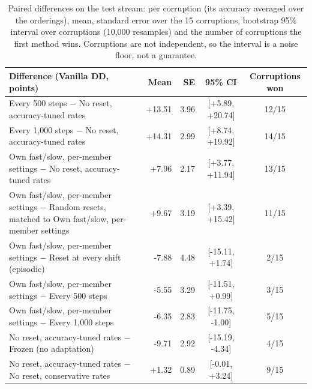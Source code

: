 \begin{table}[t]
  \centering\small
  \begin{tabular}{@{}lrrcc@{}}
    \toprule
    Difference (Vanilla DD, points) & Mean & SE & 95\% CI & Corruptions won \\
    \midrule
    Every 500 steps $-$ No reset, accuracy-tuned rates & +13.51 & 3.96 & [+5.89, +20.74] & 12/15 \\
    Every 1,000 steps $-$ No reset, accuracy-tuned rates & +14.31 & 2.99 & [+8.74, +19.92] & 14/15 \\
    Own fast/slow, per-member settings $-$ No reset, accuracy-tuned rates & +7.96 & 2.17 & [+3.77, +11.94] & 13/15 \\
    Own fast/slow, per-member settings $-$ Random resets, matched to Own fast/slow, per-member settings & +9.67 & 3.19 & [+3.39, +15.42] & 11/15 \\
    Own fast/slow, per-member settings $-$ Reset at every shift (episodic) & -7.88 & 4.48 & [-15.11, +1.74] & 2/15 \\
    Own fast/slow, per-member settings $-$ Every 500 steps & -5.55 & 3.29 & [-11.51, +0.99] & 3/15 \\
    Own fast/slow, per-member settings $-$ Every 1,000 steps & -6.35 & 2.83 & [-11.75, -1.00] & 5/15 \\
    No reset, accuracy-tuned rates $-$ Frozen (no adaptation) & -9.71 & 2.92 & [-15.19, -4.34] & 4/15 \\
    No reset, accuracy-tuned rates $-$ No reset, conservative rates & +1.32 & 0.89 & [-0.01, +3.24] & 9/15 \\
    \bottomrule
  \end{tabular}
  \caption{Paired differences on the test stream: per corruption (its accuracy averaged over the orderings), mean, standard error over the 15 corruptions, bootstrap 95\% interval over corruptions (10,000 resamples) and the number of corruptions the first method wins. Corruptions are not independent, so the interval is a noise floor, not a guarantee.}
  \label{tab:final_paired}
\end{table}
